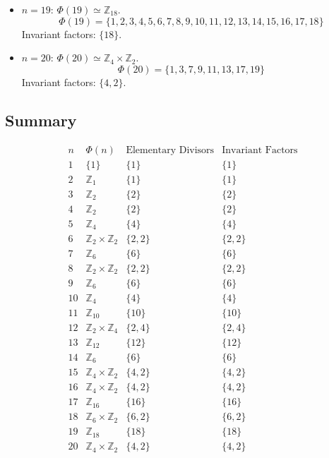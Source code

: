 \documentclass[12pt]{amsart}
\theoremstyle{definition}
\numberwithin{equation}{section}
\newcommand{\Z}{\mathbb{Z}}
\begin{document}
\begin{exercise}{8}
\begin{itemize}
        \item \(n = 19\): \(\Phi(19) \simeq \Z_{18}\).
        \[
        \Phi(19) = \{1, 2, 3, 4, 5, 6, 7, 8, 9, 10, 11, 12, 13, 14, 15, 16, 17, 18\}
        \]
        Invariant factors: \(\{18\}\).

        \item \(n = 20\): \(\Phi(20) \simeq \Z_4 \times \Z_2\).
        \[
        \Phi(20) = \{1, 3, 7, 9, 11, 13, 17, 19\}
        \]
        Invariant factors: \(\{4, 2\}\).
    \end{itemize}
    
    \subsection*{Summary}

    \[
    \begin{array}{c|c|c|c}
    n & \Phi(n) & \text{Elementary Divisors} & \text{Invariant Factors} \\
    \hline
    1 & \{1\} & \{1\} & \{1\} \\
    2 & \Z_1 & \{1\} & \{1\} \\
    3 & \Z_2 & \{2\} & \{2\} \\
    4 & \Z_2 & \{2\} & \{2\} \\
    5 & \Z_4 & \{4\} & \{4\} \\
    6 & \Z_2 \times \Z_2 & \{2, 2\} & \{2, 2\} \\
    7 & \Z_6 & \{6\} & \{6\} \\
    8 & \Z_2 \times \Z_2 & \{2, 2\} & \{2, 2\} \\
    9 & \Z_6 & \{6\} & \{6\} \\
    10 & \Z_4 & \{4\} & \{4\} \\
    11 & \Z_{10} & \{10\} & \{10\} \\
    12 & \Z_2 \times \Z_4 & \{2, 4\} & \{2, 4\} \\
    13 & \Z_{12} & \{12\} & \{12\} \\
    14 & \Z_6 & \{6\} & \{6\} \\
    15 & \Z_4 \times \Z_2 & \{4, 2\} & \{4, 2\} \\
    16 & \Z_4 \times \Z_2 & \{4, 2\} & \{4, 2\} \\
    17 & \Z_{16} & \{16\} & \{16\} \\
    18 & \Z_6 \times \Z_2 & \{6, 2\} & \{6, 2\} \\
    19 & \Z_{18} & \{18\} & \{18\} \\
    20 & \Z_4 \times \Z_2 & \{4, 2\} & \{4, 2\} \\
    \end{array}
    \]

\end{exercise}
\end{document}
